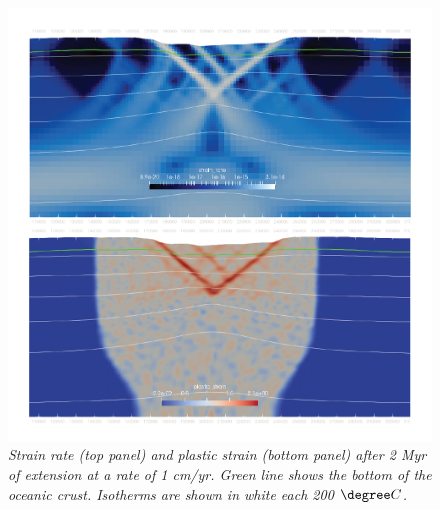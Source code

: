 \begin{figure}
\centering
\includegraphics[width=\textwidth]{cookbooks/oceanic_extension/doc/figure_2Myr.png}
\caption{\it Strain rate (top panel) and plastic strain (bottom panel) after 2 Myr of extension at a rate of 1 cm/yr. Green line shows the bottom of the oceanic crust. Isotherms are shown in white each 200 $\degree C$.}
\label{fig:figure_2Myr}
\end{figure}



